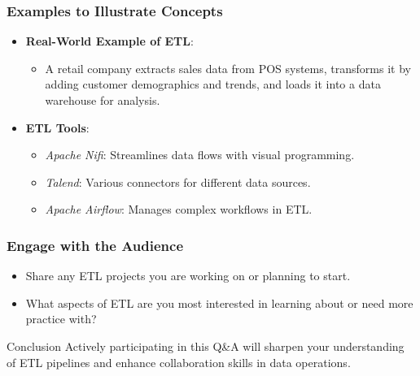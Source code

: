\documentclass[aspectratio=169]{beamer}
\begin{document}
\begin{frame}[fragile]
    \frametitle{Examples to Illustrate Concepts}
    \begin{itemize}
        \item \textbf{Real-World Example of ETL}:
        \begin{itemize}
            \item A retail company extracts sales data from POS systems, transforms it by adding customer demographics and trends, and loads it into a data warehouse for analysis.
        \end{itemize}
        \item \textbf{ETL Tools}:
        \begin{itemize}
            \item \textit{Apache Nifi}: Streamlines data flows with visual programming.
            \item \textit{Talend}: Various connectors for different data sources.
            \item \textit{Apache Airflow}: Manages complex workflows in ETL.
        \end{itemize}
    \end{itemize}
\end{frame}

\begin{frame}[fragile]
    \frametitle{Engage with the Audience}
    \begin{itemize}
        \item Share any ETL projects you are working on or planning to start.
        \item What aspects of ETL are you most interested in learning about or need more practice with?
    \end{itemize}
    \begin{block}{Conclusion}
        Actively participating in this Q\&A will sharpen your understanding of ETL pipelines and enhance collaboration skills in data operations.
    \end{block}
\end{frame}
\end{document}
